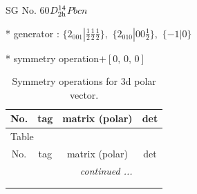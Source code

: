 \documentclass[fleqn,8pt]{jsarticle}
\begin{document}
\setcounter{MaxMatrixCols}{32}

\renewcommand{\tablename}{Table~}
\renewcommand{\figurename}{Figure~}
\begin{center}
\LARGE
SG No. 60\quad$D_{\rm 2h}^{14}$\quad$Pbcn$\quad[ orthorhombic ]
\end{center}

* generator : $\{2{}_{001}|\frac{1}{2} \frac{1}{2} \frac{1}{2}\},\,\,\{2{}_{010}|0 0 \frac{1}{2}\},\,\,\{-1|0\}$

* symmetry operation\quad$+\left[ 0,\, 0,\, 0 \right]$
\renewcommand{\arraystretch}{1.3}
\begin{longtable}{cccc}
\caption{Symmetry operations for 3d polar vector.}
 \\
 \hline \hline
No. & tag & matrix (polar) & det \\ \hline \endfirsthead

\multicolumn{3}{l}{\tablename\ \thetable{}} \\
 \hline \hline
No. & tag & matrix (polar) & det \\ \hline \endhead

 \hline \hline
\multicolumn{3}{r}{\footnotesize\it continued ...} \\ \endfoot

 \hline \hline
\multicolumn{3}{r}{} \\ \endlastfoot


\end{longtable}
\end{document}
